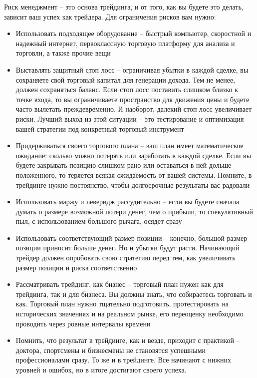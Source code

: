 \documentclass[a5paper]{article}
\begin{document}
Риск менеджмент – это основа трейдинга, и от того, как вы будете это делать, зависит ваш успех как трейдера. Для ограничения рисков вам нужно:
\begin{itemize}
\item     Использовать подходящее оборудование – быстрый компьютер, скоростной и надежный интернет, первоклассную торговую платформу для анализа и торговли, а также прочие вещи
\item     Выставлять защитный стоп лосс – ограничивая убытки в каждой сделке, вы сохраняете свой торговый капитал для генерации дохода. Тем не менее, должен сохраняться баланс. Если стоп лосс поставить слишком близко к точке входа, то вы ограничиваете пространство для движения цены и будете часто вылетать преждевременно. И наоборот, далекий стоп лосс увеличивает риски. Лучший выход из этой ситуации – это тестирование и оптимизация вашей стратегии под конкретный торговый инструмент
\item     Придерживаться своего торгового плана – ваш план имеет математическое ожидание: сколько можно потерять или заработать в каждой сделке. Если вы будете закрывать позицию слишком рано или оставаться в ней дольше положенного, то теряется всякая ожидаемость от вашей системы. Помните, в трейдинге нужно постоянство, чтобы долгосрочные результаты вас радовали
\item     Использовать маржу и леверидж рассудительно – если вы будете сначала думать о размере возможной потери денег, чем о прибыли, то спекулятивный пыл, с использованием большого рычага, осядет сразу
\item     Использовать соответствующий размер позиции – конечно, большой размер позиции приносит больше денег. Но и убытки будут расти. Начинающий трейдер должен опробовать свою стратегию перед тем, как увеличивать размер позиции и риска соответственно
\item     Рассматривать трейдинг, как бизнес – торговый план нужен как для трейдинга, так и для бизнеса. Вы должны знать, что собираетесь торговать и как.  Торговый план нужно тщательно подготовить, протестировать на исторических значениях и на реальном рынке, его переоценку необходимо проводить через ровные интервалы времени
\item     Помнить, что результат в трейдинге, как и везде, приходит с практикой – доктора, спортсмены и бизнесмены не становятся успешными профессионалами сразу. То же и в трейдинге. Все начинают с нижних уровней и ошибок, но в итоге достигают своего успеха.
\end{itemize}
\end{document}

